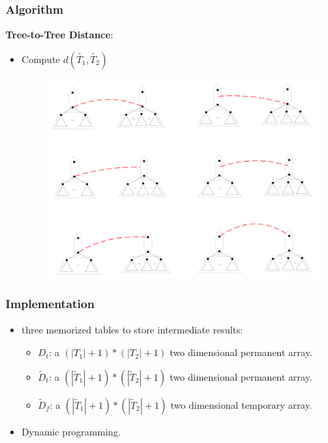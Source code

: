 \documentclass{beamer}
\begin{document}
\begin{frame}
\frametitle{Algorithm}
\textbf{Tree-to-Tree Distance}:
\begin{itemize}
\item Compute $d(\widetilde{T_1}, \widetilde{T_2})$
\begin{figure}
	\includegraphics[width=0.85\linewidth]{treetreecompressed}
	\centering
\end{figure}
\end{itemize}
\end{frame}
\begin{frame}
\frametitle{Implementation}
\begin{itemize}
\item three memorized tables to store intermediate results:
\begin{itemize}
\item $D_t$: a $(\left\vert T_1 \right\vert + 1) * (\left\vert T_2 \right\vert + 1)$ two dimensional permanent array.
\item $\widetilde{D}_t$: a $(\left\vert \widetilde{T}_1 \right\vert + 1) * (\left\vert \widetilde{T}_2 \right\vert + 1)$ two dimensional permanent array.
\item $\widetilde{D}_f$: a $(\left\vert \widetilde{T}_1 \right\vert + 1) * (\left\vert \widetilde{T}_2 \right\vert  + 1)$ two dimensional temporary array.
\end{itemize}
\item Dynamic programming.
\end{itemize}
\end{frame}
\end{document}
